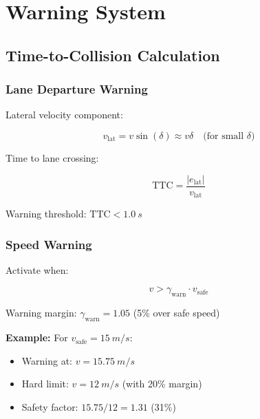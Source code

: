 \documentclass[11pt,a4paper]{article}
\begin{document}
\section{Warning System}

\subsection{Time-to-Collision Calculation}

\subsubsection{Lane Departure Warning}

Lateral velocity component:

\begin{equation}
v_{\text{lat}} = v \sin(\delta) \approx v \delta \quad \text{(for small } \delta\text{)}
\end{equation}

Time to lane crossing:

\begin{equation}
\text{TTC} = \frac{|e_{\text{lat}}|}{v_{\text{lat}}}
\end{equation}

Warning threshold: $\text{TTC} < \SI{1.0}{s}$

\subsubsection{Speed Warning}

Activate when:

\begin{equation}
v > \gamma_{\text{warn}} \cdot v_{\text{safe}}
\end{equation}

Warning margin: $\gamma_{\text{warn}} = 1.05$ (5\% over safe speed)

\textbf{Example:} For $v_{\text{safe}} = \SI{15}{m/s}$:
\begin{itemize}
    \item Warning at: $v = \SI{15.75}{m/s}$
    \item Hard limit: $v = \SI{12}{m/s}$ (with 20\% margin)
    \item Safety factor: $15.75/12 = 1.31$ (31\%)
\end{itemize}
\end{document}

